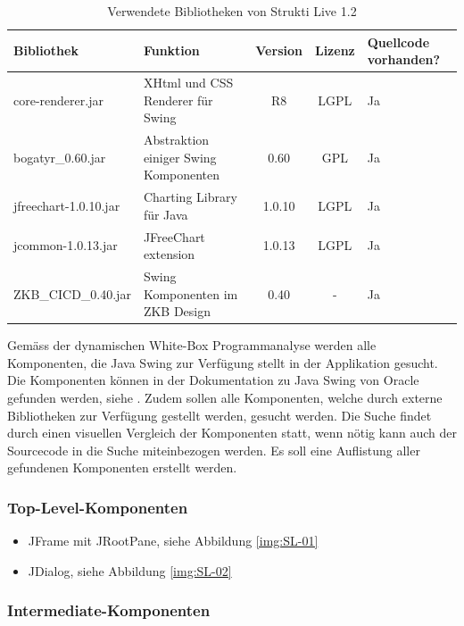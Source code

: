   \begin{table}[ht]
    \begin{center}
      \begin{tabular}{lp{4.5cm}ccp{2cm}}
        \toprule
        Bibliothek & Funktion & Version & Lizenz & Quellcode vorhanden?\\
        \midrule
        core-renderer.jar & XHtml und CSS Renderer für Swing & R8 & LGPL & Ja\\
        bogatyr\_0.60.jar & Abstraktion einiger Swing Komponenten & 0.60 & GPL &
        Ja\\
        jfreechart-1.0.10.jar & Charting Library für Java & 1.0.10 & LGPL & Ja\\
        jcommon-1.0.13.jar & JFreeChart extension & 1.0.13 & LGPL & Ja\\
        ZKB\_CICD\_0.40.jar & Swing Komponenten im ZKB Design & 0.40 & - & Ja\\
        \bottomrule
      \end{tabular}
      \caption{Verwendete Bibliotheken von Strukti Live 1.2}
      \label{tab:bibliothekenStruktiLive}
    \end{center}
  \end{table}
  
  Gemäss der dynamischen White-Box Programmanalyse werden alle Komponenten, die
  Java Swing zur Verfügung stellt in der Applikation gesucht. Die Komponenten
  können in der Dokumentation zu Java Swing von Oracle gefunden werden, siehe
  \cite{SwingComponentsByOracle}. Zudem sollen alle Komponenten, welche durch
  externe Bibliotheken zur Verfügung gestellt werden, gesucht werden. Die
  Suche findet durch einen visuellen Vergleich der Komponenten statt, wenn
  nötig kann auch der Sourcecode in die Suche miteinbezogen werden. Es soll eine
  Auflistung aller gefundenen Komponenten erstellt werden.
  
  \subsubsection{Top-Level-Komponenten}
  
  \begin{itemize}
  \item JFrame mit JRootPane, siehe Abbildung \ref{img:SL-01}
  \item JDialog, siehe Abbildung \ref{img:SL-02}
  \end{itemize}
  
  \subsubsection{Intermediate-Komponenten}
  
